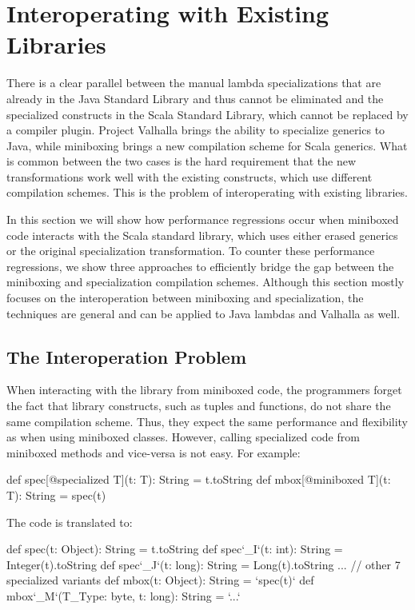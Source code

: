 \section{Interoperating with Existing Libraries}
\label{mbox2:sec:library}

There is a clear parallel between the manual lambda specializations that are already in the Java Standard Library and thus cannot be eliminated and the specialized constructs in the Scala Standard Library, which cannot be replaced by a compiler plugin. Project Valhalla brings the ability to specialize generics to Java, while miniboxing brings a new compilation scheme for Scala generics. What is common between the two cases is the hard requirement that the new transformations work well with the existing constructs, which use different compilation schemes. This is the problem of interoperating with existing libraries.

In this section we will show how performance regressions occur when miniboxed code interacts with the Scala standard library, which uses either erased generics or the original specialization transformation. To counter these performance regressions, we show three approaches to efficiently bridge the gap between the miniboxing and specialization compilation schemes. Although this section mostly focuses on the interoperation between miniboxing and specialization, the techniques are general and can be applied to Java lambdas and Valhalla as well.

\subsection{The Interoperation Problem}

When interacting with the library from miniboxed code, the programmers forget the fact that library constructs, such as tuples and functions, do not share the same compilation scheme. Thus, they expect the same performance and flexibility as when using miniboxed classes. However, calling specialized code from miniboxed methods and vice-versa is not easy. For example:

\begin{lstlisting-nobreak}
 def spec[@specialized T](t: T): String = t.toString
 def mbox[@miniboxed T](t: T): String = spec(t)
\end{lstlisting-nobreak}



The code is translated to:

\begin{lstlisting-nobreak}
 def spec(t: Object): String = t.toString
 def spec`_I`(t: int): String = Integer(t).toString
 def spec`_J`(t: long): String = Long(t).toString
 ... // other 7 specialized variants
 def mbox(t: Object): String = `spec(t)`
 def mbox`_M`(T_Type: byte, t: long): String = `...`
\end{lstlisting-nobreak}

